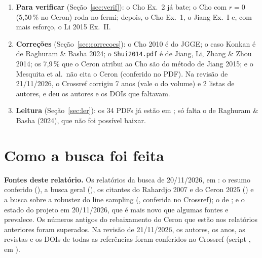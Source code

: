 \documentclass[11pt,a4paper]{article}
\begin{document}
\begin{enumerate}
    quase todos de passagem; ninguém refez o caso. O vizinho mais próximo de
    outro grupo é \citet{wang2022}; o concorrente a observar, o \citet{hsrlem2026}. O nosso LS do MEF dá
    11,61\,\% (IC de 95\,\%: 10,49--12,73\,\%), contra 11,50\,\% do artigo; a análise limite em Python dá 10,32\,\%,
    diferença ainda sem explicação.
  \item \textbf{Para verificar} (Seção~\ref{sec:verif}): o Cho Ex.~2 já bate; o Cho com $r = 0$ (5,50\,\% no Ceron)
    roda no fermi; depois, o Cho Ex.~1, o Jiang Ex.~I e, com mais esforço, o Li 2015 Ex.~II.
  \item \textbf{Correções} (Seção~\ref{sec:correcoes}): o Cho 2010 é do JGGE; o caso Konkan é de Raghuram \& Basha
    2024; o \texttt{Shui2014.pdf} é de Jiang, Li, Zhang \& Zhou 2014; os 7,9\,\% que o Ceron atribui ao Cho são do
    método de Jiang 2015; e o Mesquita et al.\ não cita o Ceron (conferido no PDF). Na revisão de 21/11/2026, o
    Crossref corrigiu 7 anos (vale o do volume) e 2 listas de autores, e deu os autores e os DOIs que faltavam.
  \item \textbf{Leitura} (Seção~\ref{sec:ler}): os 34 PDFs já estão em ; só falta
    o de Raghuram \& Basha (2024), que não foi possível baixar.
\end{enumerate}

\section{Como a busca foi feita}\label{sec:busca}
\textbf{Fontes deste relatório.} Os relatórios da busca de 20/11/2026, em
: o resumo conferido (), a
busca geral (), os citantes do Rahardjo 2007 e do Ceron 2025
() e a busca sobre a robustez do line sampling
(, conferida no Crossref); o  de
; e o estado do projeto em 20/11/2026, que é mais novo que algumas fontes e
prevalece. Os números antigos do rebaixamento do Ceron que estão nos relatórios anteriores foram superados. Na revisão
de 21/11/2026, os autores, os anos, as revistas e os DOIs de todas as referências foram conferidos no Crossref (script
, em ).
\end{document}

